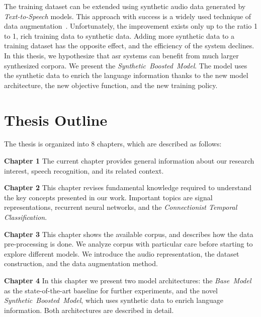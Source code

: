 The training dataset can be extended using synthetic audio data generated by \textit{Text-to-Speech} models.
This approach with success is a widely used technique of data augmentation~\cite{li2018,jia2019,li2019,kuchaiev2018}.
Unfortunately, the improvement exists only up to the ratio 1 to 1, rich training data to synthetic data.
Adding more synthetic data to a training dataset has the opposite effect, and the efficiency of the system declines.
In this thesis, we hypothesize that \acrshort{asr} systems can benefit from much larger synthesized corpora.
We present the \textit{Synthetic~Boosted~Model}.
The model uses the synthetic data to enrich the language information thanks to
the new model architecture, the new objective function, and the new training policy.

\section{Thesis Outline}\label{sec:thesis-outline}

The thesis is organized into 8 chapters, which are described as follows:

\vspace{0.2cm}
\noindent\textbf{Chapter 1}\hspace{0.2cm} The current chapter provides general information about our research
interest, speech recognition, and its related context.

\vspace{0.2cm}
\noindent\textbf{Chapter 2}\hspace{0.2cm} This chapter revises fundamental knowledge required to understand
the key concepts presented in our work.
Important topics are signal representations, recurrent neural networks,
and the \textit{Connectionist Temporal Classification}.

\vspace{0.2cm}
\noindent\textbf{Chapter 3}\hspace{0.2cm} This chapter shows the available corpus,
and describes how the data pre-processing is done.
We analyze corpus with particular care before starting to explore different models.
We introduce the audio representation, the dataset construction, and the data augmentation method.

\vspace{0.2cm}
\noindent\textbf{Chapter 4}\hspace{0.2cm} In this chapter we present two model architectures:
the \textit{Base~Model} as the state-of-the-art baseline for further experiments, and
the novel \textit{Synthetic~Boosted~Model}, which uses synthetic data to enrich language information.
Both architectures are described in detail.

